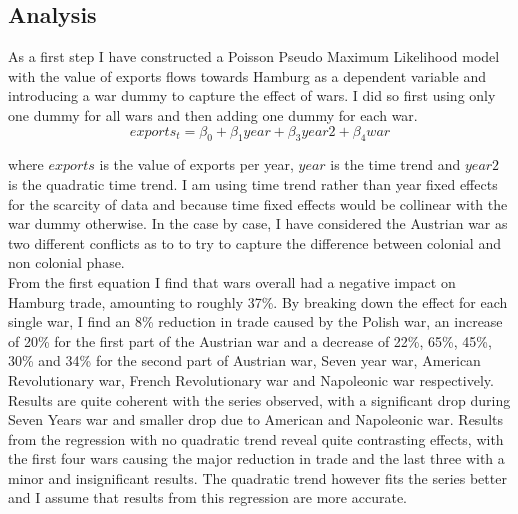 \documentclass[12pt,a4paper,titlepage]{article}
\begin{document}
\subsection{Analysis}
As a first step I have constructed a Poisson Pseudo Maximum Likelihood model with the value of exports flows towards Hamburg as a dependent variable and introducing a war dummy to capture the effect of wars. I did so first using only one dummy for all wars and then adding one dummy for each war. 
\begin{equation}
exports_t=\beta_0+\beta_1year+\beta_3year2 +\beta_4war
\end{equation}

where $exports$  is the value of exports per year,  $year$ is the time trend and $year2$ is the quadratic time trend. I am using time trend rather than year fixed effects for the scarcity of data and because time fixed effects would be collinear with the war dummy otherwise.
In the case by case, I have considered the Austrian war as two different conflicts
 as to to try to capture the difference between colonial and non colonial phase.\\
From the first equation I find that wars overall had a negative impact on Hamburg trade, amounting to roughly 37\%. By breaking down the effect for each single war, I find an 8\% reduction in trade caused by the Polish war, an increase of 20\% for the first part of the Austrian war and a decrease of 22\%, 65\%, 45\%, 30\% and 34\% for the second part of Austrian war, Seven year war,  American Revolutionary war, French Revolutionary war and Napoleonic war respectively. Results are quite coherent with the series observed, with a significant drop during Seven Years war and smaller drop due to American and Napoleonic war. 
Results from the regression with no quadratic trend reveal quite contrasting effects, with the first four wars causing the major reduction in trade and the last three with a minor and insignificant results. The quadratic trend however fits the series better and I assume that results from this regression  are more accurate.
\end{document}

